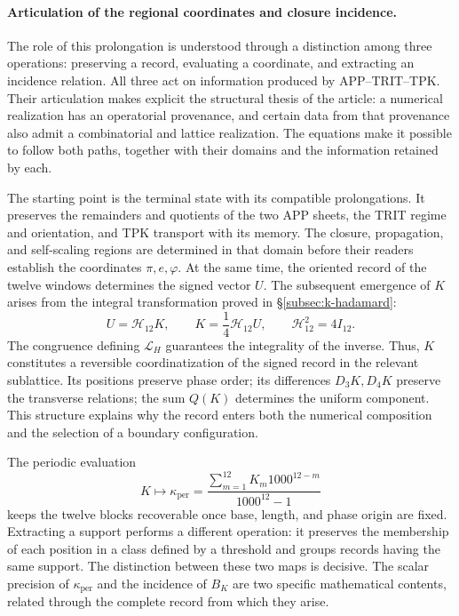 \paragraph{Articulation of the regional coordinates and closure incidence.}
\label{inc-ampl-articulacion}
The role of this prolongation is understood through a distinction among three
operations: preserving a record, evaluating a coordinate, and extracting an
incidence relation. All three act on information produced by
APP--TRIT--TPK. Their articulation makes explicit the structural thesis of
the article: a numerical realization has an operatorial provenance, and
certain data from that provenance also admit a combinatorial and lattice
realization. The equations make it possible to follow both paths, together
with their domains and the information retained by each.

The starting point is the terminal state with its compatible prolongations.
It preserves the remainders and quotients of the two APP sheets, the TRIT
regime and orientation, and TPK transport with its memory. The closure,
propagation, and self-scaling regions are determined in that domain before
their readers establish the coordinates $\pi,e,\varphi$. At the same time,
the oriented record of the twelve windows determines the signed vector $U$.
The subsequent emergence of $K$ arises from the integral transformation
proved in
\S\ref{subsec:k-hadamard}:
\begin{equation}
 U=\mathcal H_{12}K,\qquad
 K=\frac14\mathcal H_{12}U,\qquad
 \mathcal H_{12}^{2}=4I_{12}.
 \label{inc-ampl-registro}
\end{equation}
The congruence defining $\mathcal L_H$ guarantees the integrality of the
inverse. Thus, $K$ constitutes a reversible coordinatization of the signed
record in the relevant sublattice. Its positions preserve phase order; its
differences $D_3K,D_4K$ preserve the transverse relations; the sum $Q(K)$
determines the uniform component. This structure explains why the record
enters both the numerical composition and the selection of a boundary
configuration.

The periodic evaluation
\[
 K\longmapsto\kappa_{\mathrm{per}}
 =\frac{\sum_{m=1}^{12}K_m1000^{12-m}}{1000^{12}-1}
\]
keeps the twelve blocks recoverable once base, length, and phase origin are
fixed. Extracting a support performs a different operation: it preserves the
membership of each position in a class defined by a threshold and groups
records having the same support. The distinction between these two maps is
decisive. The scalar precision of $\kappa_{\mathrm{per}}$ and the incidence
of $B_K$ are two specific mathematical contents, related through the complete
record from which they arise.
